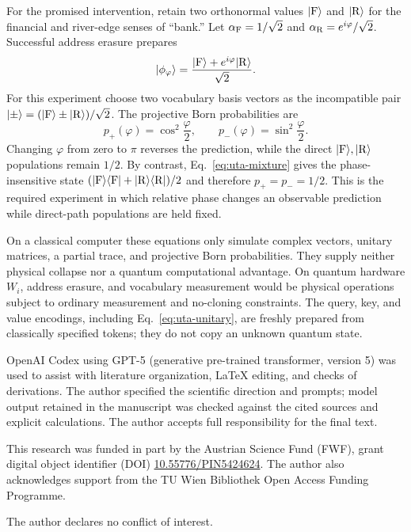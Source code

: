 \documentclass[
  aps,
  reprint,
  superscriptaddress,
  floatfix,
  nofootinbib,
  longbibliography
]{revtex4-2}
\begin{document}
For the promised intervention, retain two orthonormal values
$|{\rm F}\rangle$ and $|{\rm R}\rangle$ for the financial and river-edge
senses of ``bank.''  Let
$\alpha_{\rm F}=1/\sqrt2$ and
$\alpha_{\rm R}=e^{i\varphi}/\sqrt2$.  Successful address erasure prepares
\begin{equation}
 |\phi_\varphi\rangle
 =\frac{|{\rm F}\rangle+e^{i\varphi}|{\rm R}\rangle}{\sqrt2}.
\label{eq:uta-bank-state}
\end{equation}
For this experiment choose two vocabulary basis vectors as the incompatible
pair $|\mathord{\pm}\rangle=(|{\rm F}\rangle\pm|{\rm R}\rangle)/\sqrt2$.
The projective Born probabilities are
\begin{equation}
 p_+(\varphi)=\cos^2\frac{\varphi}{2},\qquad
 p_-(\varphi)=\sin^2\frac{\varphi}{2}.
\label{eq:uta-bank-fringe}
\end{equation}
Changing $\varphi$ from zero to $\pi$ reverses the prediction, while the
direct $|{\rm F}\rangle,|{\rm R}\rangle$ populations remain $1/2$.  By
contrast, Eq.~\eqref{eq:uta-mixture} gives the phase-insensitive state
$(|{\rm F}\rangle\langle{\rm F}|
 +|{\rm R}\rangle\langle{\rm R}|)/2$ and therefore $p_+=p_-=1/2$.
This is the required experiment in which relative phase changes an observable
prediction while direct-path populations are held fixed.

On a classical computer these equations only simulate complex vectors,
unitary matrices, a partial trace, and projective Born probabilities.  They
supply neither physical collapse nor a quantum computational advantage.  On
quantum hardware $W_i$, address erasure, and vocabulary measurement would be
physical operations subject to ordinary measurement and no-cloning
constraints.  The query, key, and value encodings, including
Eq.~\eqref{eq:uta-unitary}, are freshly prepared from classically specified
tokens; they do not copy an unknown quantum state.


\begin{acknowledgments}
OpenAI Codex using GPT-5 (generative pre-trained transformer, version 5) was
used to assist with literature organization, \LaTeX{}
editing, and checks of derivations.  The author specified the scientific
direction and prompts; model output retained in the manuscript was checked
against the cited sources and explicit calculations.  The author accepts full
responsibility for the final text.

This research was funded in part by the Austrian Science Fund (FWF), grant
digital object identifier (DOI)
\href{https://doi.org/10.55776/PIN5424624}{10.55776/PIN5424624}.
The author also acknowledges support from the TU Wien Bibliothek Open Access
Funding Programme.

The author declares no conflict of interest.
\end{acknowledgments}


\end{document}
